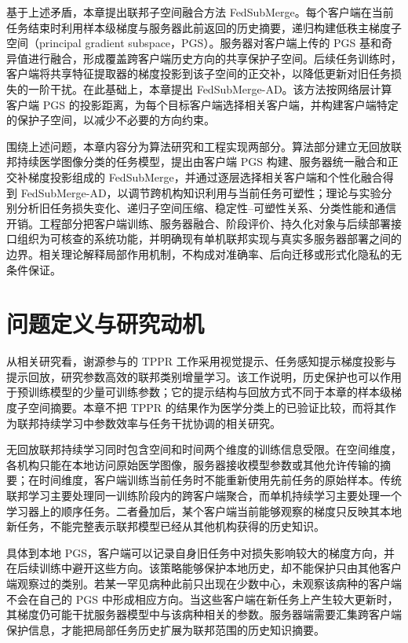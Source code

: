 基于上述矛盾，本章提出联邦子空间融合方法 FedSubMerge。每个客户端在当前任务结束时利用样本级梯度与服务器此前返回的历史摘要，递归构建低秩主梯度子空间（principal gradient subspace，PGS）。服务器对客户端上传的 PGS 基和奇异值进行融合，形成覆盖跨客户端历史方向的共享保护子空间。后续任务训练时，客户端将共享特征提取器的梯度投影到该子空间的正交补，以降低更新对旧任务损失的一阶干扰。在此基础上，本章提出 FedSubMerge-AD。该方法按网络层计算客户端 PGS 的投影距离，为每个目标客户端选择相关客户端，并构建客户端特定的保护子空间，以减少不必要的方向约束。

围绕上述问题，本章内容分为算法研究和工程实现两部分。算法部分建立无回放联邦持续医学图像分类的任务模型，提出由客户端 PGS 构建、服务器统一融合和正交补梯度投影组成的 FedSubMerge，并通过逐层选择相关客户端和个性化融合得到 FedSubMerge-AD，以调节跨机构知识利用与当前任务可塑性；理论与实验分别分析旧任务损失变化、递归子空间压缩、稳定性--可塑性关系、分类性能和通信开销。工程部分把客户端训练、服务器融合、阶段评价、持久化对象与后续部署接口组织为可核查的系统功能，并明确现有单机联邦实现与真实多服务器部署之间的边界。相关理论解释局部作用机制，不构成对准确率、后向迁移或形式化隐私的无条件保证。

\section{问题定义与研究动机}
\label{sec:fedsubmerge-motivation}

从相关研究看，谢源参与的 TPPR 工作采用视觉提示、任务感知提示梯度投影与提示回放，研究参数高效的联邦类别增量学习\cite{ke2025tppr}。该工作说明，历史保护也可以作用于预训练模型的少量可训练参数；它的提示结构与回放方式不同于本章的样本级梯度子空间摘要。本章不把 TPPR 的结果作为医学分类上的已验证比较，而将其作为联邦持续学习中参数效率与任务干扰协调的相关研究。

无回放联邦持续学习同时包含空间和时间两个维度的训练信息受限。在空间维度，各机构只能在本地访问原始医学图像，服务器接收模型参数或其他允许传输的摘要；在时间维度，客户端训练当前任务时不能重新使用先前任务的原始样本。传统联邦学习主要处理同一训练阶段内的跨客户端聚合，而单机持续学习主要处理一个学习器上的顺序任务。二者叠加后，某个客户端当前能够观察的梯度只反映其本地新任务，不能完整表示联邦模型已经从其他机构获得的历史知识。

具体到本地 PGS，客户端可以记录自身旧任务中对损失影响较大的梯度方向，并在后续训练中避开这些方向。该策略能够保护本地历史，却不能保护只由其他客户端观察过的类别。若某一罕见病种此前只出现在少数中心，未观察该病种的客户端不会在自己的 PGS 中形成相应方向。当这些客户端在新任务上产生较大更新时，其梯度仍可能干扰服务器模型中与该病种相关的参数。服务器端需要汇集跨客户端保护信息，才能把局部任务历史扩展为联邦范围的历史知识摘要。

